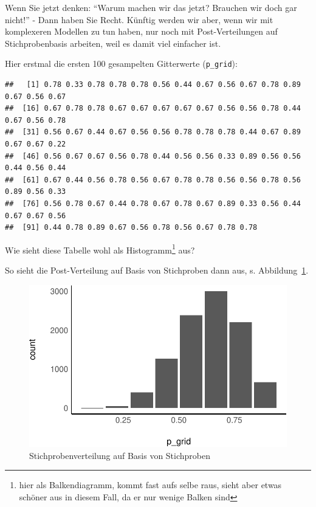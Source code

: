 \documentclass[
  a4paper,
  DIV=11]{scrreprt}
\theoremstyle{definition}
\theoremstyle{remark}
\begin{document}
Wenn Sie jetzt denken: ``Warum machen wir das jetzt? Brauchen wir doch
gar nicht!'' - Dann haben Sie Recht. Künftig werden wir aber, wenn wir
mit komplexeren Modellen zu tun haben, nur noch mit Post-Verteilungen
auf Stichprobenbasis arbeiten, weil es damit viel einfacher ist.

Hier erstmal die ersten 100 gesampelten Gitterwerte (\texttt{p\_grid}):

\begin{verbatim}
##   [1] 0.78 0.33 0.78 0.78 0.78 0.56 0.44 0.67 0.56 0.67 0.78 0.89 0.67 0.56 0.67
##  [16] 0.67 0.78 0.78 0.67 0.67 0.67 0.67 0.67 0.56 0.56 0.78 0.44 0.67 0.56 0.78
##  [31] 0.56 0.67 0.44 0.67 0.56 0.56 0.78 0.78 0.78 0.44 0.67 0.89 0.67 0.67 0.22
##  [46] 0.56 0.67 0.67 0.56 0.78 0.44 0.56 0.56 0.33 0.89 0.56 0.56 0.44 0.56 0.44
##  [61] 0.67 0.44 0.56 0.78 0.56 0.67 0.78 0.78 0.56 0.56 0.78 0.56 0.89 0.56 0.33
##  [76] 0.56 0.78 0.67 0.44 0.78 0.67 0.78 0.67 0.89 0.33 0.56 0.44 0.67 0.67 0.56
##  [91] 0.44 0.78 0.89 0.67 0.56 0.78 0.56 0.67 0.78 0.78
\end{verbatim}

Wie sieht diese Tabelle wohl als Histogramm\footnote{hier als
  Balkendiagramm, kommt fast aufs selbe raus, sieht aber etwas schöner
  aus in diesem Fall, da er nur wenige Balken sind} aus?

So sieht die Post-Verteilung auf Basis von Stichproben dann aus, s.
Abbildung~\ref{fig-samples1}.

\begin{figure}

{\centering \includegraphics{./Post_files/figure-pdf/fig-samples1-1.pdf}

}

\caption{\label{fig-samples1}Stichprobenverteilung auf Basis von
Stichproben}

\end{figure}
\end{document}
